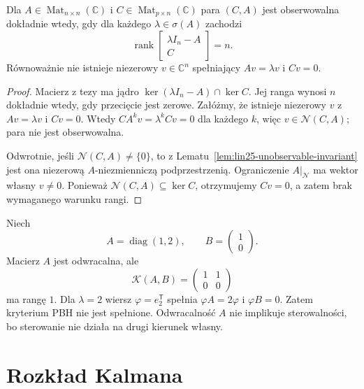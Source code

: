 \begin{wniosek}
\label{cor:lin25-pbh-observe}
Dla
\(A\in\operatorname{Mat}_{n\times n}(\mathbb C)\)
i
\(C\in\operatorname{Mat}_{p\times n}(\mathbb C)\)
para \((C,A)\)
jest obserwowalna dokładnie wtedy,
gdy dla każdego
\(\lambda\in\sigma(A)\)
zachodzi
\[
 \operatorname{rank}
 \begin{bmatrix}
 \lambda I_n-A\\C
 \end{bmatrix}=n.
\]
Równoważnie nie istnieje
niezerowy \(v\in\mathbb C^n\)
spełniający
\(Av=\lambda v\)
i \(Cv=0\).
\end{wniosek}
\begin{proof}
Macierz z tezy ma jądro
\(\ker(\lambda I_n-A)\cap\ker C\).
Jej ranga wynosi \(n\)
dokładnie wtedy, gdy
przecięcie jest zerowe.
Załóżmy, że istnieje
niezerowy \(v\)
z \(Av=\lambda v\) i \(Cv=0\).
Wtedy \(CA^kv=\lambda^kCv=0\)
dla każdego \(k\),
więc \(v\in\mathcal N(C,A)\);
para nie jest obserwowalna.

Odwrotnie, jeśli
\(\mathcal N(C,A)\ne\{0\}\),
to z
Lematu~\ref{lem:lin25-unobservable-invariant}
jest ona niezerową
\(A\)-niezmienniczą
podprzestrzenią.
Ograniczenie \(A|_{\mathcal N}\)
ma wektor własny \(v\ne0\).
Ponieważ
\(\mathcal N(C,A)\subseteq\ker C\),
otrzymujemy \(Cv=0\),
a zatem brak wymaganego
warunku rangi.
\end{proof}

\begin{przyklad}
\label{prz:lin25-pbh}
Niech
\[
 A=\operatorname{diag}(1,2),
 \qquad B=\begin{pmatrix}1\\0\end{pmatrix}.
\]
Macierz \(A\) jest odwracalna,
ale
\[
 \mathcal K(A,B)
 =\begin{pmatrix}1&1\\0&0\end{pmatrix}
\]
ma rangę \(1\).
Dla \(\lambda=2\)
wiersz \(\varphi=e_2^{\mathsf T}\)
spełnia
\(\varphi A=2\varphi\)
i \(\varphi B=0\).
Zatem kryterium PBH nie jest
spełnione. Odwracalność \(A\)
nie implikuje sterowalności,
bo sterowanie nie działa
na drugi kierunek własny.
\end{przyklad}

\section{Rozkład Kalmana}
\label{sec:lin25-kalman-decomposition}

